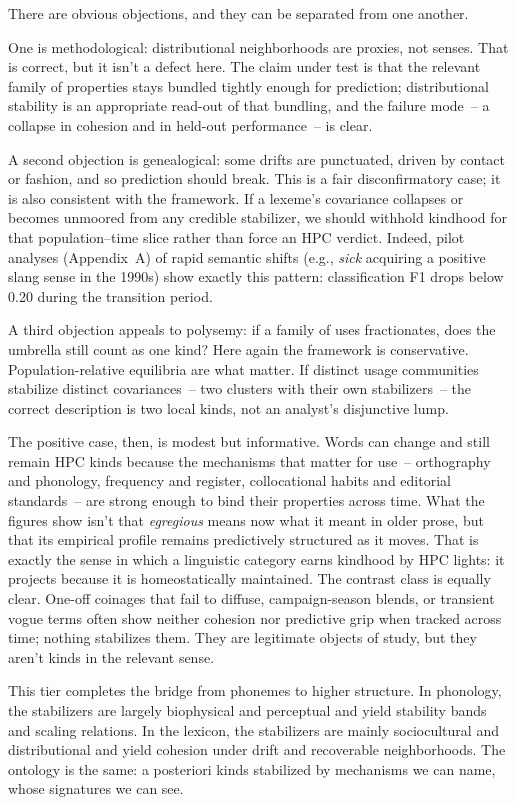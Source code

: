 \documentclass[12pt]{article}
\begin{document}
There are obvious objections, and they can be separated from one another. 

One is methodological: distributional neighborhoods are proxies, not senses. That is correct, but it isn't a defect here. The claim under test is that the relevant family of properties stays bundled tightly enough for prediction; distributional stability is an appropriate read-out of that bundling, and the failure mode~-- a collapse in cohesion and in held-out performance~-- is clear. 

A second objection is genealogical: some drifts are punctuated, driven by contact or fashion, and so prediction should break. This is a fair disconfirmatory case; it is also consistent with the framework. If a lexeme's covariance collapses or becomes unmoored from any credible stabilizer, we should withhold kindhood for that population–time slice rather than force an HPC verdict. Indeed, pilot analyses (Appendix~A) of rapid semantic shifts (e.g., \textit{sick} acquiring a positive slang sense in the 1990s) show exactly this pattern: classification F1 drops below 0.20 during the transition period.

A third objection appeals to polysemy: if a family of uses fractionates, does the umbrella still count as one kind? Here again the framework is conservative. Population-relative equilibria are what matter. If distinct usage communities stabilize distinct covariances~-- two clusters with their own stabilizers~-- the correct description is two local kinds, not an analyst's disjunctive lump.

The positive case, then, is modest but informative. Words can change and still remain \textsc{HPC} kinds because the mechanisms that matter for use~-- orthography and phonology, frequency and register, collocational habits and editorial standards~-- are strong enough to bind their properties across time. What the figures show isn't that \textit{egregious} means now what it meant in older prose, but that its empirical profile remains predictively structured as it moves. That is exactly the sense in which a linguistic category earns kindhood by HPC lights: it projects because it is homeostatically maintained. The contrast class is equally clear. One-off coinages that fail to diffuse, campaign-season blends, or transient vogue terms often show neither cohesion nor predictive grip when tracked across time; nothing stabilizes them. They are legitimate objects of study, but they aren't kinds in the relevant sense.

This tier completes the bridge from phonemes to higher structure. In phonology, the stabilizers are largely biophysical and perceptual and yield stability bands and scaling relations. In the lexicon, the stabilizers are mainly sociocultural and distributional and yield cohesion under drift and recoverable neighborhoods. The ontology is the same: a posteriori kinds stabilized by mechanisms we can name, whose signatures we can see.
\end{document}
